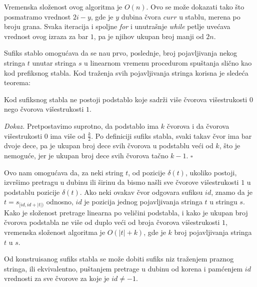 Vremenska slo\v zenost ovog algoritma je $O(n)$. Ovo se mo\v ze dokazati tako \v sto posmatramo vrednost $2i-y$, gde je $y$ dubina \v cvora $curr$ u stablu, merena po broju grana. Svaka iteracija i spoljne \textit{for} i unutra\v snje \textit{while} petlje uve\' cava vrednost ovog izraza za bar $1$, pa je njihov ukupan broj manji od $2n$.

Sufiks stablo omogu\' cava da se na\dj u prvo, poslednje, broj pojavljivanja nekog stringa $t$ unutar stringa $s$ u linearnom vremenu procedurom spu\v stanja sli\v cno kao kod prefiksnog stabla. Kod tra\v zenja svih pojavljivanja stringa korisna je slede\' ca teorema:

\begin{thm}
Kod sufiksnog stabla ne postoji podstablo koje sadr\v zi vi\v se \v cvorova vi\v sestrukosti $0$ nego \v cvorova vi\v sestrukosti $1$.
\end{thm}

\textit{Dokaz.} Pretpostavimo suprotno, da podstablo ima $k$ \v cvorova i da \v cvorova vi\v sestrukosti $0$ ima vi\v se od $\frac{k}{2}$. Po definiciji sufiks stabla, svaki takav \v cvor ima bar dvoje dece, pa je ukupan broj dece svih \v cvorova u podstablu ve\' ci od $k$, \v sto je nemogu\' ce, jer je ukupan broj dece svih \v cvorova ta\v cno $k-1$. \hfill $\square$

Ovo nam omogu\' cava da, za neki string $t$, od pozicije $\delta(t)$, ukoliko postoji, izvr\v simo pretragu u dubinu ili \v sirinu da bismo na\v sli sve \v cvorove vi\v sestrukosti $1$ u podstablu pozicije $\delta(t)$. Ako neki ovakav \v cvor odgovara sufiksu $id$, znamo da je $t = s_{[id, id+|t|)}$ odnosno, $id$ je pozicija jednog pojavljivanja stringa $t$ u stringu $s$. Kako je slo\v zenost pretrage linearna po veli\v cini podstabla, i kako je ukupan broj \v cvorova podstabla ne vi\v se od duplo ve\' ci od broja \v cvorova vi\v sestrukosti $1$, vremenska slo\v zenost algoritma je $O(|t|+k)$, gde je $k$ broj pojavljivanja stringa $t$ u $s$.

Od konstruisanog sufiks stabla se mo\v ze dobiti sufiks niz tra\v zenjem praznog stringa, ili ekvivalentno, pu\v stanjem pretrage u dubinu od korena i pam\' cenjem $id$ vrednosti za sve \v cvorove za koje je $id \not = -1$.

\noindent
\begin{minipage}[l]{\textwidth}

\end{minipage}

